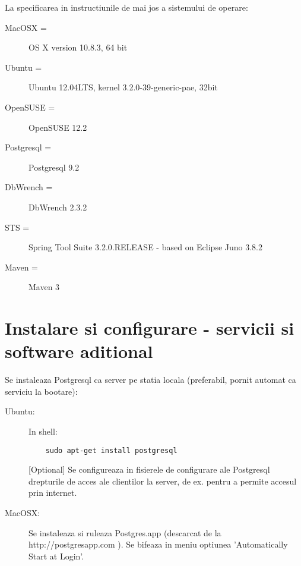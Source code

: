 La specificarea in instructiunile de mai jos a sistemului de operare:
\begin{description} 
\item [MacOSX =] OS X version 10.8.3, 64 bit
\item [Ubuntu =] Ubuntu 12.04LTS, kernel 3.2.0-39-generic-pae, 32bit
\item [OpenSUSE = ] OpenSUSE 12.2
\item [Postgresql =] Postgresql 9.2
\item [DbWrench =] DbWrench 2.3.2
\item [STS =] Spring Tool Suite 3.2.0.RELEASE - based on Eclipse Juno 3.8.2
\item [Maven =] Maven 3
\end{description}

\section{Instalare si configurare - servicii si software aditional}

Se instaleaza Postgresql ca server pe statia locala (preferabil, pornit automat ca serviciu la bootare):
\begin{description}
\item[Ubuntu:] In shell:
\begin{lstlisting}
	sudo apt-get install postgresql
\end{lstlisting}

[Optional] Se configureaza in fisierele de configurare ale Postgresql drepturile
de acces ale clientilor la server, de ex. pentru a permite accesul prin internet.

\item [MacOSX:] 
Se instaleaza si ruleaza Postgres.app (descarcat de la http://postgresapp.com ).
Se bifeaza in meniu optiunea 'Automatically Start at Login'.
\end{description}

